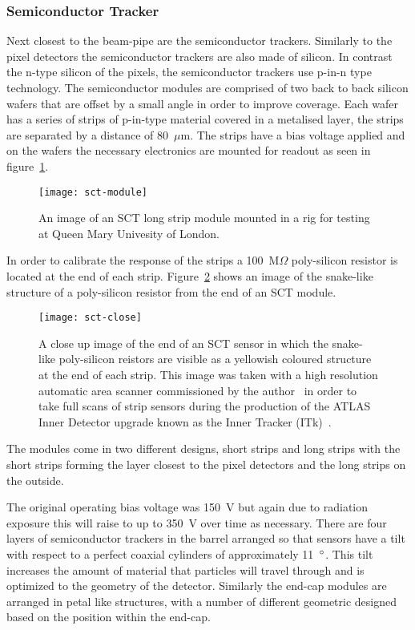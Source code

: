 \subsubsection{Semiconductor Tracker}

Next closest to the beam-pipe are the semiconductor trackers. Similarly to the pixel
detectors the semiconductor trackers are also made of silicon. In contrast the
n-type silicon of the pixels, the semiconductor trackers use p-in-n type
technology. The semiconductor modules are comprised of two back to back silicon
wafers that are offset by a small angle in order to improve coverage. Each wafer
has a series of strips of p-in-type material covered in a metalised layer, the
strips are separated by a distance of 80~$\mu$m. The strips have a bias voltage
applied and on the wafers the necessary electronics are mounted for readout as seen in
figure~\ref{fig:strip-module}.
\begin{figure}[h]
  \centering
  \texttt{[image: sct-module]}
  \caption{An image of an SCT long strip module mounted in a rig for testing at
    Queen Mary Univesity of London.}
  \label{fig:strip-module}
\end{figure}
In order to calibrate the response of the strips a 100~M$\Omega$ poly-silicon
resistor is located at the end of each strip. Figure~\ref{fig:sct-close} shows an
image of the snake-like structure of a poly-silicon resistor from the end of an
SCT module.
\begin{figure}[h]
  \centering
  \texttt{[image: sct-close]}
  \caption{A close up image of the end of an SCT sensor in which the snake-like
    poly-silicon reistors are visible as a yellowish coloured structure at the
    end of each strip. This image was taken with a high resolution automatic
    area scanner commissioned by the author~\cite{itk-scanner} in order to take
    full scans of strip sensors during the production of the ATLAS Inner
    Detector upgrade known as the Inner Tracker (ITk)~\cite{itk-tdr,
      itk-strips-tdr}.}
  \label{fig:sct-close}
\end{figure}
The modules come in two different designs, short strips and long
strips with the short strips forming the layer closest to the pixel detectors
and the long strips on the outside.



The
original operating bias voltage was 150~V but again due to radiation exposure
this will raise to up to 350~V over time as necessary. There are four layers of
semiconductor trackers in the barrel arranged so that sensors have a tilt with
respect to a perfect coaxial cylinders of approximately 11~$\degree$. This tilt
increases the amount of material that particles will travel through and is
optimized to the geometry of the detector. Similarly the end-cap modules are
arranged in petal like structures, with a number of different geometric designed
based on the position within the end-cap.

